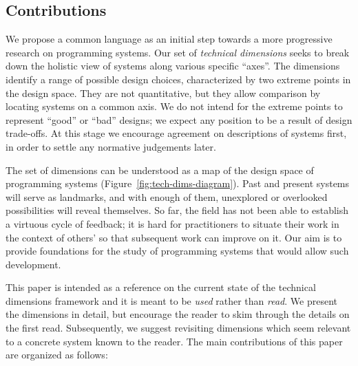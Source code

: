 \hypertarget{contributions}{%
\subsection{Contributions}\label{contributions}}

We propose a common language as an initial step towards a more
progressive research on programming systems. Our set of \emph{technical
dimensions} seeks to break down the holistic view of systems along
various specific ``axes''. The dimensions identify a range of possible
design choices, characterized by two extreme points in the design space.
They are not quantitative, but they allow comparison by locating systems
on a common axis. We do not intend for the extreme points to represent
``good'' or ``bad'' designs; we expect any position to be a result of
design trade-offs. At this stage we encourage agreement on descriptions
of systems first, in order to settle any normative judgements later.

The set of dimensions can be understood as a map of the design space of
programming systems (Figure~\ref{fig:tech-dims-diagram}). Past and
present systems will serve as landmarks, and with enough of them,
unexplored or overlooked possibilities will reveal themselves. So far,
the field has not been able to establish a virtuous cycle of feedback;
it is hard for practitioners to situate their work in the context of
others' so that subsequent work can improve on it. Our aim is to provide
foundations for the study of programming systems that would allow such
development.

This paper is intended as a reference on the current state of the
technical dimensions framework and it is meant to be \emph{used} rather
than \emph{read}. We present the dimensions in detail, but encourage the
reader to skim through the details on the first read. Subsequently, we
suggest revisiting dimensions which seem relevant to a concrete system
known to the reader. The main contributions of this paper are organized
as follows:

